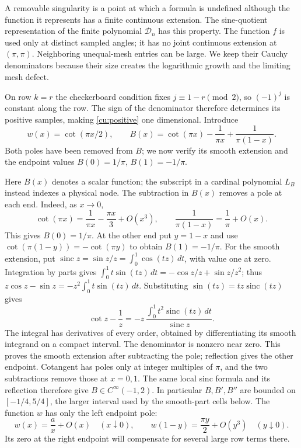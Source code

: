 A removable singularity is a point at which a formula is undefined
although the function it represents has a finite continuous extension.
The sine-quotient representation of the finite polynomial $\mathcal{D}_n$
has this property. The function $f$ is used only at distinct sampled
angles; it has no joint continuous extension at $(\pi,\pi)$.
Neighboring unequal-mesh entries can be large. We keep their Cauchy denominators
because their size creates the logarithmic growth and the limiting
mesh defect.

On row $k=r$ the checkerboard condition fixes $j\equiv1-r\pmod2$,
so $(-1)^j$ is constant along the row. The sign of the denominator
therefore determines its positive samples, making \eqref{cu:positive}
one dimensional. Introduce
\begin{equation}\label{cu:wB}
 w(x)=\cot(\pi x/2),\qquad
 B(x)=\cot(\pi x)-\frac1{\pi x}+\frac1{\pi(1-x)}.
\end{equation}
Both poles have been removed from $B$; we now verify its smooth extension
and the endpoint values $B(0)=1/\pi$, $B(1)=-1/\pi$.

Here $B(x)$ denotes a scalar function; the subscript in a cardinal
polynomial $L_B$ instead indexes a physical node. The subtraction in
$B(x)$ removes a pole at each end. Indeed, as
$x\to0$,
\[
 \cot(\pi x)=\frac1{\pi x}-\frac{\pi x}{3}+O(x^3),
 \qquad \frac1{\pi(1-x)}=\frac1\pi+O(x).
\]
This gives $B(0)=1/\pi$. At the other end put $y=1-x$ and use
$\cot(\pi(1-y))=-\cot(\pi y)$ to obtain $B(1)=-1/\pi$.
For the smooth extension, put
$\operatorname{sinc}z=\sin z/z=\int_0^1\cos(tz)\,dt$, with value one at zero.
Integration by parts gives
$\int_0^1t\sin(tz)\,dt=-\cos z/z+\sin z/z^2$; thus
$z\cos z-\sin z=-z^2\int_0^1t\sin(tz)\,dt$. Substituting
$\sin(tz)=tz\operatorname{sinc}(tz)$ gives
\[
 \cot z-\frac1z
 =-z\,\frac{\int_0^1t^2\operatorname{sinc}(tz)\,dt}
                  {\operatorname{sinc}z}.
\]
The integral has derivatives of every order, obtained by differentiating
its smooth integrand on a compact interval. The denominator is nonzero
near zero. This proves the smooth extension after subtracting the pole;
reflection gives the other endpoint. Cotangent has poles only at
integer multiples of $\pi$, and the two subtractions remove those at
$x=0,1$. The same local sinc formula and its reflection therefore give
$B\in C^\infty(-1,2)$. In particular $B,B',B''$ are bounded on
$[-1/4,5/4]$, the larger interval used by the smooth-part cells below.
The function $w$ has only the left endpoint pole:
\[
 w(x)=\frac{a}{x}+O(x)\quad(x\downarrow0),\qquad
 w(1-y)=\frac{\pi y}{2}+O(y^3)\quad(y\downarrow0).
\]
Its zero at the right endpoint will compensate for several large
row terms there.

